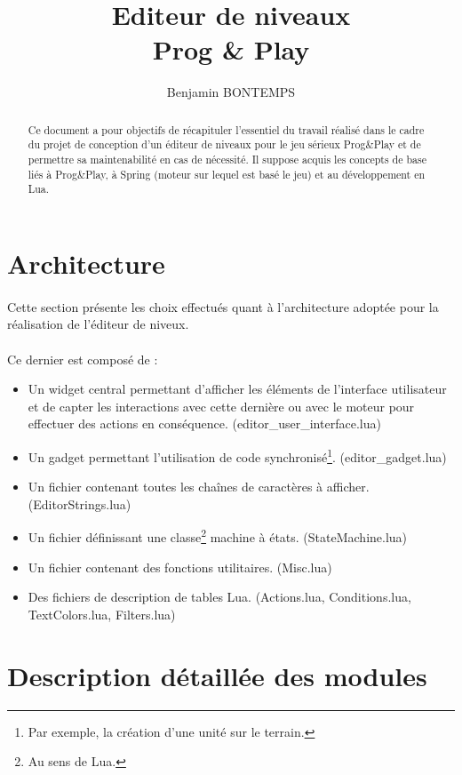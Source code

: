 \documentclass[a4paper]{article}
\title{Editeur de niveaux\\Prog \& Play}
\author{Benjamin BONTEMPS}
\begin{document}
\maketitle

\begin{abstract}
Ce document a pour objectifs de récapituler l'essentiel du travail réalisé dans le cadre du projet de conception d'un éditeur de niveaux pour le jeu sérieux Prog\&Play et de permettre sa maintenabilité en cas de nécessité. Il suppose acquis les concepts de base liés à Prog\&Play, à Spring (moteur sur lequel est basé le jeu) et au développement en Lua.
\end{abstract}

\tableofcontents

\newpage

\section{Architecture}
\paragraph{}
Cette section présente les choix effectués quant à l'architecture adoptée pour la réalisation de l'éditeur de niveux.
\paragraph{}
Ce dernier est composé de :
\begin{itemize}
\item Un widget central permettant d'afficher les éléments de l'interface utilisateur et de capter les interactions avec cette dernière ou avec le moteur pour effectuer des actions en conséquence. (editor\_user\_interface.lua)
\item Un gadget permettant l'utilisation de code synchronisé\footnote{Par exemple, la création d'une unité sur le terrain.}. (editor\_gadget.lua)
\item Un fichier contenant toutes les chaînes de caractères à afficher. (EditorStrings.lua)
\item Un fichier définissant une classe\footnote{Au sens de Lua.} machine à états. (StateMachine.lua)
\item Un fichier contenant des fonctions utilitaires. (Misc.lua)
\item Des fichiers de description de tables Lua. (Actions.lua, Conditions.lua, TextColors.lua, Filters.lua)
\end{itemize}
\section{Description détaillée des modules}
\end{document}
